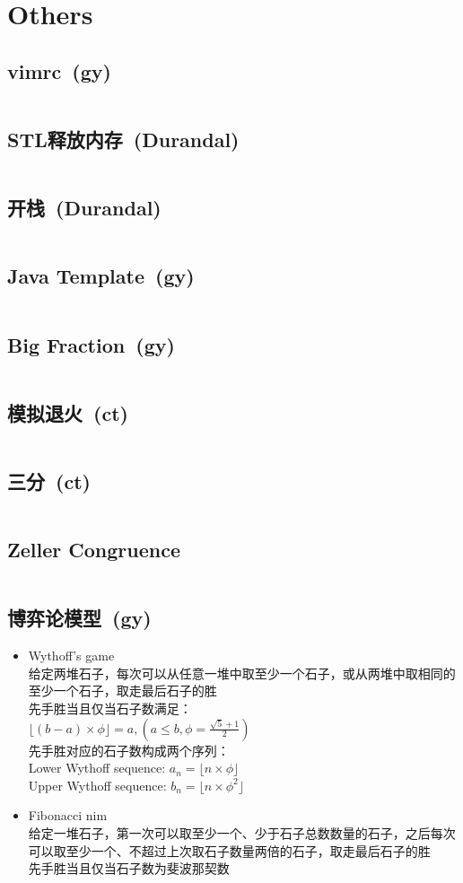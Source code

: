 \chapter{Others}
\section{vimrc\ \small(gy)}
	\inputminted{vim}{Others/.vimrc}
\section{STL释放内存\ \small(Durandal)}
	\inputminted{cpp}{Others/stl_clear.cpp}
\section{开栈\ \small(Durandal)}
	\inputminted{cpp}{Others/rsp.cpp}
\section{Java Template\ \small(gy)}
	\inputminted{java}{Others/Template.java}
\section{Big Fraction\ \small(gy)}
	\inputminted{kotlin}{Others/big_fraction.kt}
\section{模拟退火\ \small(ct)}
	\inputminted{cpp}{Others/simulated_annealing.cpp}
\section{三分\ \small(ct)}
	\inputminted{cpp}{Others/cubic_search.cpp}
\section{Zeller Congruence}
	\inputminted{cpp}{Others/zeller_congruence.cpp}
\section{博弈论模型\ \small(gy)}
	\begin{itemize}
		\item Wythoff's game
			\\给定两堆石子，每次可以从任意一堆中取至少一个石子，或从两堆中取相同的至少一个石子，取走最后石子的胜
			\\先手胜当且仅当石子数满足：
			\\$\lfloor (b - a) \times \phi \rfloor=a, (a \leq b, \phi = \frac{\sqrt{5} + 1}{2})$
			\\先手胜对应的石子数构成两个序列：
			\\Lower Wythoff sequence: $a_n = \lfloor n \times \phi \rfloor$
			\\Upper Wythoff sequence: $b_n = \lfloor n \times \phi ^ 2 \rfloor$
		\item Fibonacci nim
			\\给定一堆石子，第一次可以取至少一个、少于石子总数数量的石子，之后每次可以取至少一个、不超过上次取石子数量两倍的石子，取走最后石子的胜
			\\先手胜当且仅当石子数为斐波那契数
	\end{itemize}
